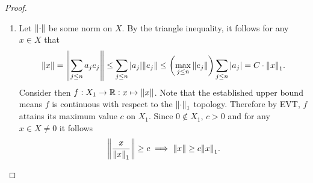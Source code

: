\documentclass[hw_all.tex]{subfiles}
\begin{document}
\begin{proof}
\begin{enumerate}
        \item 
            Let $\norm{\cdot}$ be some norm on $X$. By the triangle inequality, it follows for any $x \in X$ that
            \[
                \norm{x} = \norm{\sum_{j \leq n} a_j e_j} \leq \sum_{j \leq n} |a_j| \norm{e_j} \leq \qty(\max_{j \leq n} \norm{e_j}) \sum_{j \leq n} |a_j| = C \cdot \norm{x}_1
            .\]
            Consider then $f : X_1 \to \mathbb{R} : x \mapsto \norm{x}$. Note that the established upper bound means $f$ is continuous with respect to the $\norm{\cdot}_1$ topology. Therefore by EVT, $f$ attains its maximum value $c$ on $X_1$. Since $0 \notin X_1$, $c > 0$ and for any $x \in X \neq 0$ it follows
            \[
                \norm{\frac{x}{\norm{x}_1}} \geq c \implies \norm{x} \geq c \norm{x}_1
            .\]
    \end{enumerate}
\end{proof}
\end{document}
